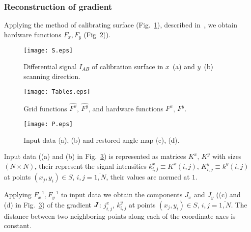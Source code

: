 \documentclass{beamer}
\begin{document}
\begin{frame}[c,allowframebreaks]
    \frametitle{Reconstruction of gradient}

    Applying the method of calibrating surface (Fig.~\ref{fig:inputSphere}), described in~\cite{main},
    we obtain hardware functions $F_x, F_y$ (Fig~\ref{fig:Tables})).

    \begin{figure}[hp]
        \texttt{[image: S.eps]}
        \caption{\small Differential signal $I_{AB}$ of calibration surface in $x$~(a) and $y$~(b)
        scanning direction.}
        {\label{fig:inputSphere}}%
    \end{figure}

    \framebreak

    \begin{figure}
        \texttt{[image: Tables.eps]}
        \caption{Grid functions $\hat{F^x}$, $\hat{F^y}$, and hardware functions $F^x$, $F^y$.}
        {\label{fig:Tables}}%
    \end{figure}

    \framebreak

    \begin{figure}
        \texttt{[image: P.eps]}
        \caption{Input data (a), (b) and restored angle map (c), (d).}
        {\label{fig:input_data}}%
    \end{figure}

    Input data ((a) and (b) in Fig.~\ref{fig:input_data}) is represented as matrices $K^x$, $K^y$
    with sizes $(N \times N)$, their represent the signal intensities $k^x_{i,j} \equiv K^x (i,j)$,
    $K^y_{i,j} \equiv k^y (i,j)$ at points $(x_j, y_i) \in S$, $i,j = \overline{1,N}$, their values
    are normed at $1$.

    Applying $F_x^{-1}, F_y^{-1}$ to input data we obtain the components $J_x$ and $J_y$
    ((c) and (d) in Fig.~\ref{fig:input_data}) of the gradient ${\textbf{\emph{J}}}$: $j^x_{i,j}$,
    $k^y_{i,j}$ at points $(x_j, y_i) \in S$, $i,j = \overline{1,N}$. The distance between two
    neighboring points along each of the coordinate axes is constant.

\end{frame}
\end{document}
